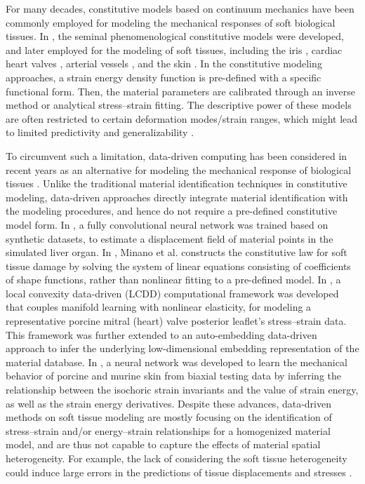 \documentclass[twocolumn,10pt]{asme2ej}
\renewcommand{\~}{\tilde}
\renewcommand{\-}{\bar}
\newcommand{\8}{\infty}
\numberwithin{equation}{section}
\begin{document}
For many decades, constitutive models based on continuum mechanics have been commonly employed for modeling the mechanical responses of soft biological tissues. In \cite{fung1979pseudoelasticity}, the seminal phenomenological constitutive models were developed, and later employed for the modeling of soft tissues, including the iris \cite{pant2018appropriate}, cardiac heart valves \cite{may1998constitutive,prot2007transversely,sacks2016novel}, arterial vessels \cite{van2011generic}, and the skin \cite{bischoff2000finite}. In the constitutive modeling approaches, a strain energy density function is pre-defined with a specific functional form. Then, the material parameters are calibrated through an inverse method or analytical stress--strain fitting. The descriptive power of these models are often restricted to certain deformation modes/strain ranges, which might lead to limited predictivity and generalizability \cite{lee2014inverse,he2021manifold,lee2017vivo}.

    
To circumvent such a limitation, data-driven computing has been considered in recent years as an alternative for modeling the mechanical response of biological tissues \cite{pfeiffer2019learning,he2021manifold,he2021deep,tac2021data}. Unlike the traditional material identification techniques in constitutive modeling, data-driven approaches directly integrate material identification with the modeling procedures, and hence do not require a pre-defined constitutive model form. In \cite{pfeiffer2019learning}, a fully convolutional neural network was trained based on synthetic datasets, to estimate a displacement field of material points in the simulated liver organ. In \cite{minano2018wypiwyg}, Mi{\~n}ano et al. constructs the constitutive law for soft tissue damage by solving the system of linear equations consisting of coefficients of shape functions, rather than nonlinear fitting to a pre-defined model. In \cite{he2021manifold}, a local convexity data-driven (LCDD) computational framework was developed that couples manifold learning with nonlinear elasticity, for modeling a representative porcine mitral (heart) valve posterior leaflet's stress--strain data. This framework was further extended to an auto-embedding data-driven approach \cite{he2021deep} to infer the underlying low-dimensional embedding representation of the material database. In \cite{tac2021data}, a neural network was developed to learn the mechanical behavior of porcine and murine skin from biaxial testing data by inferring the relationship between the isochoric strain invariants and the value of strain energy, as well as the strain energy derivatives. Despite these advances, data-driven methods on soft tissue modeling are  mostly focusing on the identification of stress--strain and/or energy--strain relationships for a homogenized material model, and are thus not capable to capture the effects of material spatial heterogeneity. For example, the lack of considering the soft tissue heterogeneity could induce large errors in the predictions of tissue displacements and stresses  \cite{howell2017role}. 
\end{document}
